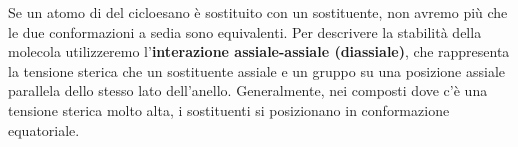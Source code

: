 Se un atomo di  del cicloesano è sostituito con un sostituente, non avremo più che le due conformazioni a sedia sono equivalenti. Per descrivere la stabilità della molecola utilizzeremo l'\textbf{interazione assiale-assiale (diassiale)}, che rappresenta la tensione sterica che un sostituente assiale e un gruppo su una posizione assiale parallela dello stesso lato dell'anello. Generalmente, nei composti dove c'è una tensione sterica molto alta, i sostituenti si posizionano in conformazione equatoriale.
